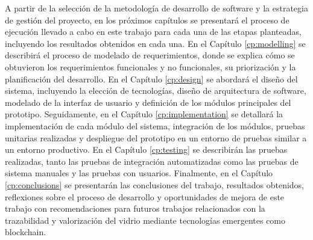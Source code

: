 A partir de la selección de la metodología de desarrollo de software y la estrategia de gestión del proyecto, en los próximos capítulos se presentará el proceso de ejecución llevado a cabo en este trabajo para cada una de las etapas planteadas, incluyendo los resultados obtenidos en cada una.
En el Capítulo \ref{cp:modelling} se describirá el proceso de modelado de requerimientos, donde se explica cómo se obtuvieron los requerimientos funcionales y no funcionales, su priorización y la planificación del desarrollo.
En el Capítulo \ref{cp:design} se abordará el diseño del sistema, incluyendo la elección de tecnologías, diseño de arquitectura de software, modelado de la interfaz de usuario y definición de los módulos principales del prototipo.
Seguidamente, en el Capítulo \ref{cp:implementation} se detallará la implementación de cada módulo del sistema, integración de los módulos, pruebas unitarias realizadas y despliegue del prototipo en un entorno de pruebas similar a un entorno productivo.
En el Capítulo \ref{cp:testing} se describirán las pruebas realizadas, tanto las pruebas de integración automatizadas como las pruebas de sistema manuales y las pruebas con usuarios.
Finalmente, en el Capítulo \ref{cp:conclusions} se presentarán las conclusiones del trabajo, resultados obtenidos, reflexiones sobre el proceso de desarrollo y oportunidades de mejora de este trabajo con recomendaciones para futuros trabajos relacionados con la trazabilidad y valorización del vidrio mediante tecnologías emergentes como blockchain.
